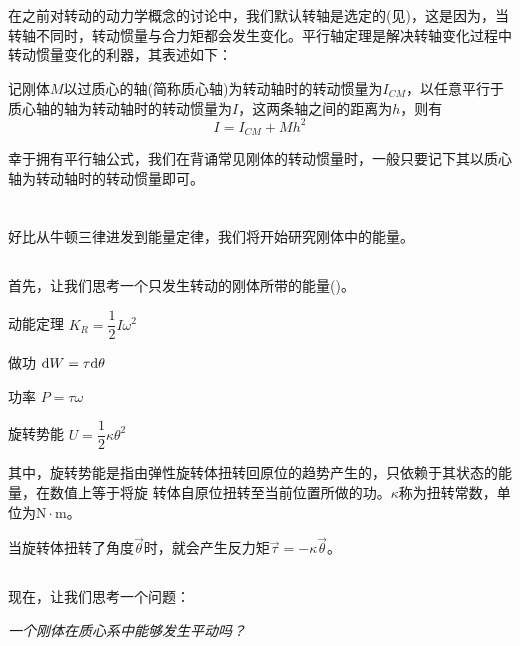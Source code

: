 \section[平行轴定理/施泰纳定理]{}
在之前对转动的动力学概念的讨论中，我们默认转轴是选定的(见)，这是因为，当转轴不同时，转动惯量与合力矩都会发生变化。平行轴定理是解决转轴变化过程中转动惯量变化的利器，其表述如下：
\newpage
\begin{law}
	记刚体$M$以过质心的轴(简称质心轴)为转动轴时的转动惯量为$I_{CM}$，以任意平行于质心轴的轴为转动轴时的转动惯量为$I$，这两条轴之间的距离为$h$，则有
	\[I=I_{CM}+Mh^2\]
\end{law}

幸于拥有平行轴公式，我们在背诵常见刚体的转动惯量时，一般只要记下其以质心轴为转动轴时的转动惯量即可。

\section[刚体中的能量]{}
好比从牛顿三律进发到能量定律，我们将开始研究刚体中的能量。
\subsection[纯转动中的能量]{}
首先，让我们思考一个只发生转动的刚体所带的能量()。
\begin{Itemize}
	\item 动能定理 $K_R=\dfrac{1}{2}I\omega^2$
	\item 做功 $\mathrm{d} W=\tau\mathrm{d}\theta$
	\item 功率 $P=\tau\omega$
	\item 旋转势能 $U=\dfrac{1}{2}\kappa\theta^2$
\end{Itemize}
其中，旋转势能是指由弹性旋转体扭转回原位的趋势产生的，只依赖于其状态的能量，在数值上等于将旋
转体自原位扭转至当前位置所做的功。$\kappa$称为扭转常数，单位为$\mathrm{N}\cdot\mathrm{m}$。

当旋转体扭转了角度$\vec{\theta}$时，就会产生反力矩$\vec{\tau}=-\kappa\vec{\theta}$。
\subsection[同时发生转动与平动时的能量]{}
现在，让我们思考一个问题：
\begin{center}
	\itshape 一个刚体在质心系中能够发生平动吗？
\end{center}

